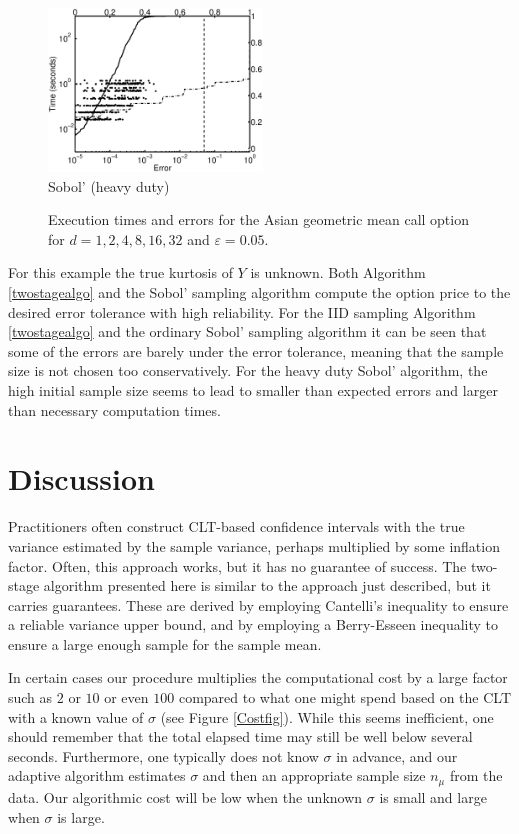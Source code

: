 \documentclass[graybox]{svmult}
\begin{document}
\begin{figure}
\begin{minipage}{5.7cm} \centering \includegraphics[width=5.7cm]{geomeanSobolheavyErrTime.eps} \\ Sobol' (heavy duty) \end{minipage}
\caption{Execution times and errors for the Asian geometric mean call option for $d=1, 2, 4, 8, 16, 32$ and $\varepsilon=0.05$.\label{AsianGeoMeanCallFig}}
\end{figure}

For this example the true kurtosis of $Y$ is unknown.  
Both  Algorithm \ref{twostagealgo} and the  Sobol' sampling algorithm compute the option price to the desired error tolerance with high reliability.  For the IID sampling Algorithm \ref{twostagealgo} and the ordinary Sobol' sampling algorithm it can be seen that some of the errors are barely under the error tolerance, meaning that the sample size is not 
chosen too conservatively.  For the heavy duty Sobol' algorithm, the high initial sample size seems to lead to smaller than expected errors and larger than necessary 
computation times.

\section{Discussion} \label{discusssec}

Practitioners often construct CLT-based confidence intervals with the true variance estimated by the sample variance, perhaps multiplied by some inflation factor.  Often, this approach works, but it has no guarantee of success.  The two-stage algorithm presented here is similar to the approach just described, but it carries guarantees. These are derived by employing Cantelli's inequality to ensure a reliable variance upper bound, and by employing a Berry-Esseen inequality to ensure a large enough sample for the sample mean.  

In certain cases our procedure multiplies the computational cost by a large factor such as $2$ or $10$ or even $100$ compared to what one might spend based on the CLT with a known value of $\sigma$ (see Figure \ref{Costfig}).  While this seems inefficient, one should remember that the total elapsed time may still be well below several seconds.  Furthermore, one typically does not know $\sigma$ in advance, and our adaptive algorithm estimates $\sigma$ and then an appropriate sample size $n_\mu$ from the data.  Our algorithmic cost will be low when the unknown $\sigma$ is small and large when $\sigma$ is large.
\end{document}
